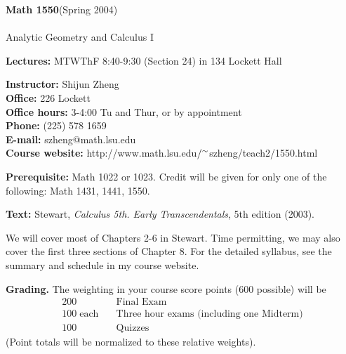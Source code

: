 \documentclass[12pt]{article}
\begin{document}
\begin{center}
\begin{large}
{\bf Math 1550}\quad (Spring 2004)\\
\quad \\
 Analytic Geometry and Calculus I
\end{large}
\end{center}


\vspace{.1756in}
\noindent
{\bf Lectures:} MTWThF 8:40-9:30  (Section 24) in 134 Lockett Hall

\vspace{.1056in}
\noindent
{\bf Instructor:} Shijun Zheng\\  
{\bf Office:}  226 Lockett\\ 
{\bf Office hours:} 3-4:00 Tu and Thur, or by appointment\\
{\bf Phone:} (225) 578 1659 \\
{\bf E-mail:} szheng@math.lsu.edu\\
{\bf Course website:} http://www.math.lsu.edu$/^{\tiny{\sim}}$szheng/teach2/1550.html 

\vspace{.2in}
\noindent
{\bf Prerequisite:}
Math 1022 or 1023. 
 Credit will be given for only one of the following: Math 1431, 1441, 1550.
  
\vspace{.15in}
\noindent
{\bf Text:} Stewart, \emph{Calculus 5th. Early Transcendentals}, 5th edition (2003). 

\vspace{.2in}

We will cover most of Chapters 2-6 in Stewart. Time permitting, we may also cover
the first three sections of Chapter 8.  For the detailed 
syllabus, see the summary and schedule in my course website.

\vspace{0.15in}
\noindent
{\bf Grading.} 
The weighting in your course score  points (600 possible) will be 
$$
\begin{array}{ll}
200 \quad   & \text{Final Exam}\\          
100\; \text{each} \quad & \text{Three hour exams (including one Midterm)}\\    
  100   \quad & \text{Quizzes }
\end{array}
$$
  (Point totals will be normalized to these relative weights). 
\end{document}
